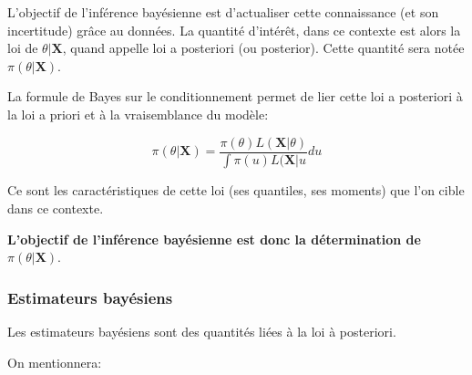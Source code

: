 L'objectif de l'inférence bayésienne est d'actualiser cette connaissance (et son incertitude) grâce au données. La quantité d'intérêt, dans ce contexte est alors la loi de $\theta\vert \mathbf{X}$, quand appelle loi a posteriori (ou posterior). Cette quantité sera notée 
$\pi(\theta \vert \mathbf{X})$.

La formule de Bayes sur le conditionnement permet de lier cette loi a posteriori à la loi a priori et à la vraisemblance du modèle:

$$\pi(\theta\vert \mathbf{X}) = \frac{\pi(\theta)L(\mathbf{X}\vert \theta)}{\int \pi(u)L(\mathbf{X}\vert u} d u$$


Ce sont les caractéristiques de cette loi (ses quantiles, ses moments) que l'on cible dans ce contexte. 

\textbf{L'objectif de l'inférence bayésienne est donc la détermination de $\pi(\theta\vert \mathbf{X})$}.

\subsubsection{Estimateurs bayésiens}

Les estimateurs bayésiens sont des quantités liées à la loi à posteriori.

On mentionnera:

\begin{itemize}
\end{itemize}


